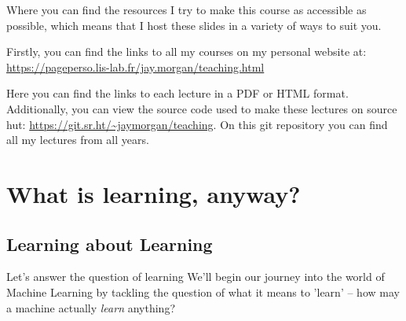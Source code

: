\documentclass[10pt]{beamer}
\begin{document}
\begin{frame}[label={sec:org8d7e189}]{Where you can find the resources}
I try to make this course as accessible as possible, which means that I host these
slides in a variety of ways to suit you.

Firstly, you can find the links to all my courses on my personal website at:
\url{https://pageperso.lis-lab.fr/jay.morgan/teaching.html}

Here you can find the links to each lecture in a PDF or HTML format. Additionally,
you can view the source code used to make these lectures on source hut:
\url{https://git.sr.ht/\~jaymorgan/teaching}. On this git repository you can find all my
lectures from all years.
\end{frame}

\section*{What is learning, anyway?}
\label{sec:org8e90b9f}

\subsection*{Learning about Learning}
\label{sec:org90bae5c}

\begin{frame}[label={sec:orge687f7c}]{Let's answer the question of learning}
We'll begin our journey into the world of Machine Learning by tackling the question
of what it means to 'learn' -- how may a machine actually \emph{learn} anything?
\end{frame}
\end{document}
